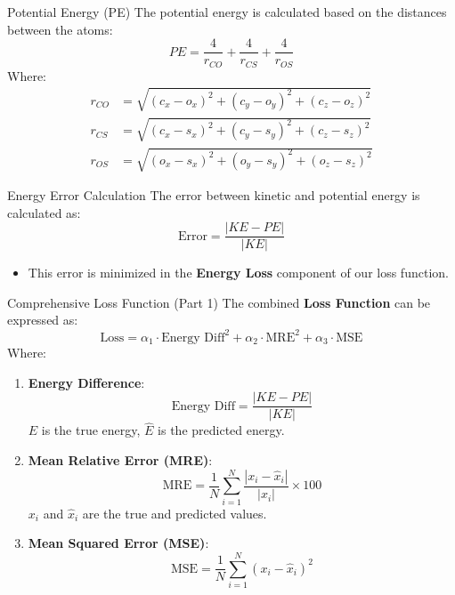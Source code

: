 \documentclass[9pt]{beamer}
\begin{document}
\begin{frame}{Potential Energy (PE)}
  The potential energy is calculated based on the distances between the atoms:
  \[
  PE = \frac{4}{r_{CO}} + \frac{4}{r_{CS}} + \frac{4}{r_{OS}}
  \]
  Where:
  \[
  \begin{aligned}
  r_{CO} &= \sqrt{(c_x - o_x)^2 + (c_y - o_y)^2 + (c_z - o_z)^2} \\
  r_{CS} &= \sqrt{(c_x - s_x)^2 + (c_y - s_y)^2 + (c_z - s_z)^2} \\
  r_{OS} &= \sqrt{(o_x - s_x)^2 + (o_y - s_y)^2 + (o_z - s_z)^2}
  \end{aligned}
  \]
\end{frame}

\begin{frame}{Energy Error Calculation}
  The error between kinetic and potential energy is calculated as:
  \[
  \text{Error} = \frac{\left| KE - PE \right|}{\left| KE \right|}
  \]
  \begin{itemize}
    \item This error is minimized in the \textbf{Energy Loss} component of our loss function.
  \end{itemize}
\end{frame}



\begin{frame}{Comprehensive Loss Function (Part 1)}
  The combined \textbf{Loss Function} can be expressed as:
  \[
  \text{Loss} = \alpha_1 \cdot \text{Energy Diff}^2 + \alpha_2 \cdot \text{MRE}^2 + \alpha_3 \cdot \text{MSE}
  \]
  Where:
  \begin{enumerate}
    \setcounter{enumi}{0} %
    \item \textbf{Energy Difference}:
      \[
      \text{Energy Diff} = \frac{\left| KE - PE \right|}{\left| KE \right|}
      \]
      \( E \) is the true energy, \( \hat{E} \) is the predicted energy.
    \item \textbf{Mean Relative Error (MRE)}:
      \[
      \text{MRE} = \frac{1}{N} \sum_{i=1}^{N} \frac{|x_i - \hat{x}_i|}{|x_i|} \times 100
      \]
      \( x_i \) and \( \hat{x}_i \) are the true and predicted values.
    \item \textbf{Mean Squared Error (MSE)}:
      \[
      \text{MSE} = \frac{1}{N} \sum_{i=1}^{N} (x_i - \hat{x}_i)^2
      \]
  \end{enumerate}
\end{frame}
\end{document}
